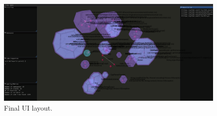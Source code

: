 \begin{figure}[h]
    \centering
    \includegraphics[width=\textwidth]{inc/images/System.png}
    \caption{Final UI layout.}
    \label{fig:finalui}
\end{figure}